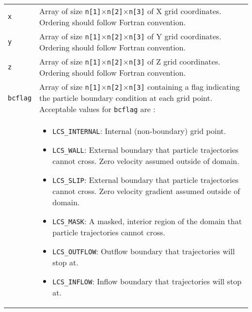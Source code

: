 \documentclass[letterpaper,11pt]{article}
\begin{document}
\begin{longtable}{p{}p{}}
\verb|x|& Array of size \verb|n[1]|$\times$\verb|n[2]|$\times$\verb|n[3]| of X grid coordinates.  Ordering should follow Fortran convention.\\
\verb|y|& Array of size \verb|n[1]|$\times$\verb|n[2]|$\times$\verb|n[3]| of Y grid coordinates.   Ordering should follow Fortran convention.\\
\verb|z|& Array of size \verb|n[1]|$\times$\verb|n[2]|$\times$\verb|n[3]| of Z grid coordinates.   Ordering should follow Fortran convention.\\
\verb|bcflag|& Array of size \verb|n[1]|$\times$\verb|n[2]|$\times$\verb|n[3]| containing a flag indicating the particle boundary condition at each grid point.  Acceptable values for \verb|bcflag| are :\\
&\begin{itemize}
  \item \verb|LCS_INTERNAL|:  Internal (non-boundary) grid point.
  \item \verb|LCS_WALL|:  External boundary that particle trajectories cannot cross.  Zero velocity assumed outside of domain.
  \item \verb|LCS_SLIP|: External boundary that particle trajectories cannot cross. Zero velocity gradient assumed outside of domain.
  \item \verb|LCS_MASK|: A masked, interior region of the domain that particle trajectories cannot cross.  
  \item \verb|LCS_OUTFLOW|: Outflow boundary that trajectories will stop at.
  \item \verb|LCS_INFLOW|: Inflow  boundary that trajectories will stop at.
 \end{itemize}\\
 \hline
\end{longtable}
\end{document}
